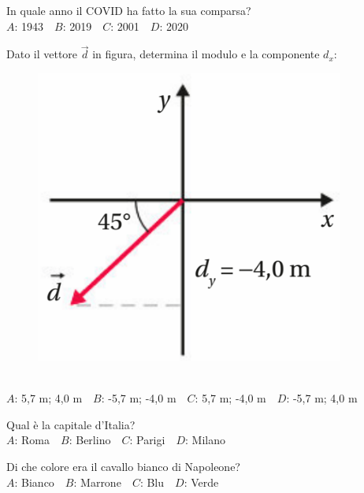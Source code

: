 \mcquestionfooter



\def\mcquestionnumber{6}


\mcquestionheader In quale anno il COVID ha fatto la sua comparsa?\\
{$A$}: 1943\ \ {$B$}: 2019\ \ {$C$}: 2001\ \ {$D$}: 2020\ \ 

\mcquestionfooter



\def\mcquestionnumber{7}


\mcquestionheader Dato il vettore $\vec{d}$ in figura, determina il modulo e la componente $d_x$: \begin{figure}[h!]   \begin{center}     \includegraphics[scale=0.35]{vettored.png}   \end{center} \end{figure}\\
{$A$}: 5,7 m; 4,0 m\ \ {$B$}: -5,7 m; -4,0 m\ \ {$C$}: 5,7 m; -4,0 m\ \ {$D$}: -5,7 m; 4,0 m\ \ 

\mcquestionfooter



\def\mcquestionnumber{8}


\mcquestionheader Qual è la capitale d’Italia?\\
{$A$}: Roma\ \ {$B$}: Berlino\ \ {$C$}: Parigi\ \ {$D$}: Milano\ \ 

\mcquestionfooter



\def\mcquestionnumber{9}


\mcquestionheader Di che colore era il cavallo bianco di Napoleone?\\
{$A$}: Bianco\ \ {$B$}: Marrone\ \ {$C$}: Blu\ \ {$D$}: Verde\ \ 

